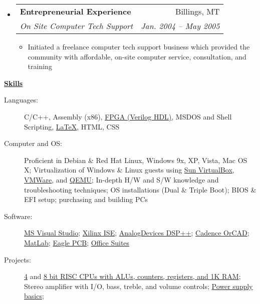 \documentclass[letterpaper,11pt]{article}
\makeatletter
\newcommand{\resheading}[1]{{\large \colorbox{mygrey}{\begin{minipage}{\textwidth}{\textbf{#1 \vphantom{p\^{E}}}}\end{minipage}}}}
\newcommand{\ressubheading}[4]{
\begin{tabular*}{6.5in}{l@{\extracolsep{\fill}}r}
		\textbf{#1} & #2 \\
		\textit{#3} & \textit{#4} \\
\end{tabular*}\vspace{-6pt}}
\makeatother
\begin{document}
\begin{itemize}
		\item			
			\ressubheading{Entrepreneurial Experience}{Billings, MT}{On Site Computer Tech Support}{Jan. 2004 -- May 2005}
				{ \footnotesize				
				\begin{itemize}
					\item Initiated a freelance computer tech support business which provided the community with affordable, on-site computer service, consultation, and training
				\end{itemize}
				}

	\end{itemize}  %

\resheading{\href{http://www.derekhildreth.com/portfolio.php}{Skills}}
	\begin{description}
		\item[Languages:] { \footnotesize C/C++, Assembly (x86), \href{http://www.latticesemi.com/products/designsoftware/isplever/ispleverstarter/index.cfm}{FPGA (Verilog HDL)}, MSDOS and Shell Scripting, \href{http://www.latex-project.org/}{\LaTeX}}, HTML, CSS
		\item[Computer and OS:] { \footnotesize Proficient in Debian \& Red Hat Linux, Windows 9x, XP, Vista, Mac OS X; Virtualization of Windows \& Linux guests using \href{http://www.virtualbox.org}{Sun VirtualBox}, \href{http://www.vmware.com}{VMWare}, and \href{http://www.qemu.com}{QEMU}; In-depth H/W and S/W knowledge and troubleshooting techniques;  OS installations (Dual \& Triple Boot);  BIOS \& EFI setup; purchasing and building PCs }
		\item[Software:]{\footnotesize \href{http://msdn.microsoft.com/en-us/library/ms950416.aspx}{MS Visual Studio}; \href{http://www.xilinx.com/tools/designtools.htm}{Xilinx ISE}; \href{http://www.analog.com}{AnalogDevices DSP++}; \href{http://www.cadence.com/products/orcad/Pages/default_test.aspx}{Cadence OrCAD}; \href{http://www.matlab.com}{MatLab}; \href{http://www.cadsoft.de/}{Eagle PCB}; \href{http://www.openoffice.org/}{Office Suites}}  
		\item[Projects:] { \footnotesize 
\href{http://www.derekhildreth.com/portfolio/Computer_Engineering/4-Bit_CPU_Fundamental_Digital_Systems_CompE224.zip}{4} 
and 
\href{http://www.derekhildreth.com/portfolio/Computer_Engineering/8-Bit_CPU_Comp_Architecture_CompE324.pdf}{8 bit RISC CPUs with ALUs, counters, registers, and 1K RAM}; 
Stereo amplifier with I/O, bass, treble, and volume controls; 
\href{http://www.derekhildreth.com/portfolio/Computer_Engineering/Zener_Diode_Power_Supply_Basics_Electrics_Devices_and_Circtuits_CompE350.pdf}{Power supply basics}; 
}
\end{description}
\end{document}
